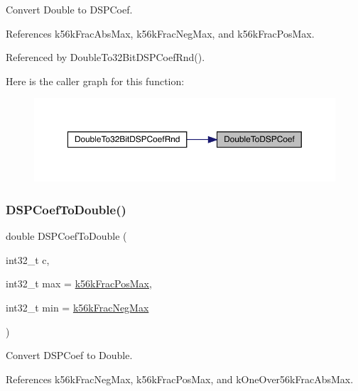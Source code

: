Convert Double to D\+S\+P\+Coef. 



References k56k\+Frac\+Abs\+Max, k56k\+Frac\+Neg\+Max, and k56k\+Frac\+Pos\+Max.



Referenced by Double\+To32\+Bit\+D\+S\+P\+Coef\+Rnd().

Here is the caller graph for this function\+:
\nopagebreak
\begin{figure}[H]
\begin{center}
\leavevmode
\includegraphics[width=350pt]{a00449_a1567c2393df9139b20166027d0127195_icgraph}
\end{center}
\end{figure}
\mbox{\label{a00449_a5e9c399a10a03718eaaf71cfcddd583f}} 
\subsubsection{\texorpdfstring{DSPCoefToDouble()}{DSPCoefToDouble()}}
{\footnotesize\ttfamily double D\+S\+P\+Coef\+To\+Double (\begin{DoxyParamCaption}\item[{int32\+\_\+t}]{c,  }\item[{int32\+\_\+t}]{max = {\ttfamily \mbox{\hyperlink{a00449_aa1f75eeb19dad78b3045cb5778421b61}{k56k\+Frac\+Pos\+Max}}},  }\item[{int32\+\_\+t}]{min = {\ttfamily \mbox{\hyperlink{a00449_a3306ddeeab535815290a268837e276b1}{k56k\+Frac\+Neg\+Max}}} }\end{DoxyParamCaption})\hspace{0.3cm}{\ttfamily [inline]}}



Convert D\+S\+P\+Coef to Double. 



References k56k\+Frac\+Neg\+Max, k56k\+Frac\+Pos\+Max, and k\+One\+Over56k\+Frac\+Abs\+Max.



